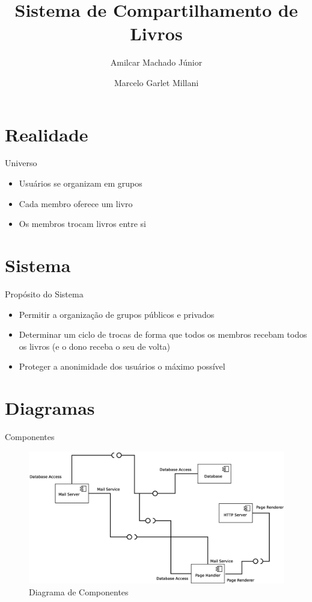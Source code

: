 \documentclass{beamer}
\title{Sistema de Compartilhamento de Livros}
\author{Amilcar Machado Júnior \and Marcelo Garlet Millani}
\institute{Instituto de Informática}
\begin{document}
\begin{frame}{}
 \maketitle 
\end{frame}

\section{Realidade}

\begin{frame}{Universo}
 
 \begin{itemize}
  \item Usuários se organizam em grupos
  \item Cada membro oferece um livro
  \item Os membros trocam livros entre si
 \end{itemize}
 
 \end{frame}
 
 \section{Sistema}
\begin{frame}{Propósito do Sistema}
	\begin{itemize}
	 \item Permitir a organização de grupos públicos e privados
	 \item Determinar um ciclo de trocas de forma que todos os membros recebam todos os livros (e o dono receba o seu de volta)
	 \item Proteger a anonimidade dos usuários o máximo possível 
	\end{itemize}
\end{frame}

\section{Diagramas}

\begin{frame}{Componentes} 
 \begin{figure}
  \includegraphics[width=\textwidth]{componentes.eps}
  \caption{Diagrama de Componentes}  
 \end{figure} 
\end{frame}
\end{document}
